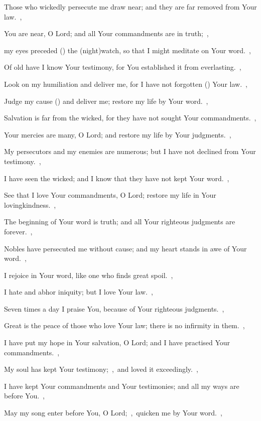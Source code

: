 \documentclass[12pt,twoside,a5paper]{article}
\begin{document}
\begin{halfparskip}
  Those who wickedly persecute me draw near; and they are far removed from Your law.~\sep

  You are near, O Lord; and all Your commandments are in truth;~\sep

  my eyes preceded () the (night)watch, so that I might meditate on Your word.~\sep

  Of old have I know Your testimony, for You established it from everlasting.~\sep

   Look on my humiliation and deliver me, for I have not forgotten () Your law.~\sep

  Judge my cause () and deliver me; restore my life by Your word.~\sep

  Salvation is far from the wicked, for they have not sought Your commandments.~\sep

  Your mercies are many, O Lord; and restore my life by Your judgments.~\sep

  My persecutors and my enemies are numerous; but I have not declined from Your testimony.~\sep

  I have seen the wicked; and I know that they have not kept Your word.~\sep

  See that I love Your commandments, O Lord; restore my life in Your lovingkindness.~\sep

  The beginning of Your word is truth; and all Your righteous judgments are forever.~\sep

   Nobles have persecuted me without cause; and my heart stands in awe of Your word.~\sep

  I rejoice in Your word, like one who finds great spoil.~\sep

  I hate and abhor iniquity; but I love Your law.~\sep

  Seven times a day I praise You, because of Your righteous judgments.~\sep

  Great is the peace of those who love Your law; there is no infirmity in them.~\sep

  I have put my hope in Your salvation, O Lord; and I have practised Your commandments.~\sep

  My soul has kept Your testimony;~\sep\ and loved it exceedingly.~\sep

  I have kept Your commandments and Your testimonies; and all my ways are before You.~\sep

   May my song enter before You, O Lord;~\sep\ quicken me by Your word.~\sep


\end{halfparskip}
\end{document}
